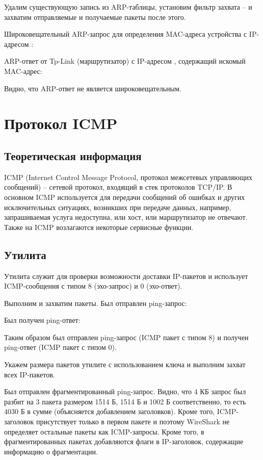 Удалим существующую запись из ARP-таблицы, установим фильтр захвата --  и захватим отправляемые и получаемые пакеты после этого. 

Широковещательный ARP-запрос для определения MAC-адреса устройства с IP-адресом :

ARP-ответ от Tp-Link (маршрутизатор) с IP-адресом , содержащий искомый MAC-адрес:

Видно, что ARP-ответ не является широковещательным.

\section{Протокол ICMP}

\subsection{Теоретическая информация}

ICMP (Internet Control Message Protocol, протокол межсетевых управляющих сообщений) -- сетевой протокол, входящий в стек протоколов TCP/IP. В основном ICMP используется для передачи сообщений об ошибках и других исключительных ситуациях, возникших при передаче данных, например, запрашиваемая услуга недоступна, или хост, или маршрутизатор не отвечают. Также на ICMP возлагаются некоторые сервисные функции.

\subsection{Утилита }

Утилита  служит для проверки возможности доставки IP-пакетов и использует ICMP-сообщения с типом 8 (эхо-запрос) и 0 (эхо-ответ).

Выполним  и захватим пакеты. Был отправлен ping-запрос:

\newpage

Был получен ping-ответ:

Таким образом был отправлен ping-запрос (ICMP пакет с типом 8) и получен ping-ответ (ICMP пакет с типом 0).

Укажем размера пакетов утилите  с использованием ключа  и выполним захват всех IP-пакетов.

Был отправлен фрагментированный ping-запрос. Видно, что 4 КБ запрос был разбит на 3 пакета размером 1514 Б, 1514 Б и 1002 Б соответственно, то есть 4030 Б в сумме (объясняется добавлением заголовков). Кроме того, ICMP-заголовок присутствует только в первом пакете и поэтому WireShark не определяет остальные пакеты как ICMP-запросы. Кроме того, в фрагментированных пакетах добавляются флаги в IP-заголовок, содержащие информацию о фрагментации.

